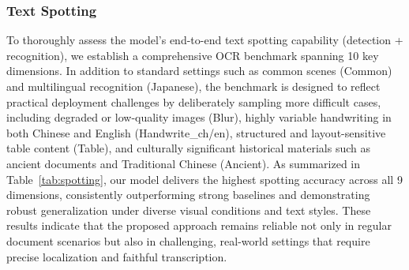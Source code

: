 \documentclass[11pt, a4paper,logo,  copyright, nonumbering]{paddleocr}
\begin{document}
\subsubsection{Text Spotting}
To thoroughly assess the model’s end-to-end text spotting capability (detection + recognition), we establish a comprehensive OCR benchmark spanning 10 key dimensions. In addition to standard settings such as common scenes (Common) and multilingual recognition (Japanese), the benchmark is designed to reflect practical deployment challenges by deliberately sampling more difficult cases, including degraded or low-quality images (Blur), highly variable handwriting in both Chinese and English (Handwrite\_ch/en), structured and layout-sensitive table content (Table), and culturally significant historical materials such as ancient documents and Traditional Chinese (Ancient). As summarized in Table~\ref{tab:spotting}, our model delivers the highest spotting accuracy across all 9 dimensions, consistently outperforming strong baselines and demonstrating robust generalization under diverse visual conditions and text styles. These results indicate that the proposed approach remains reliable not only in regular document scenarios but also in challenging, real-world settings that require precise localization and faithful transcription.
\begin{table}[htbp]
\centering
{}
\caption{Comparison of text spotting performance on the in-house benchmark. Overall denotes the average accuracy across all 9 evaluation dimensions.}
\label{tab:spotting}
\end{table}
\end{document}

